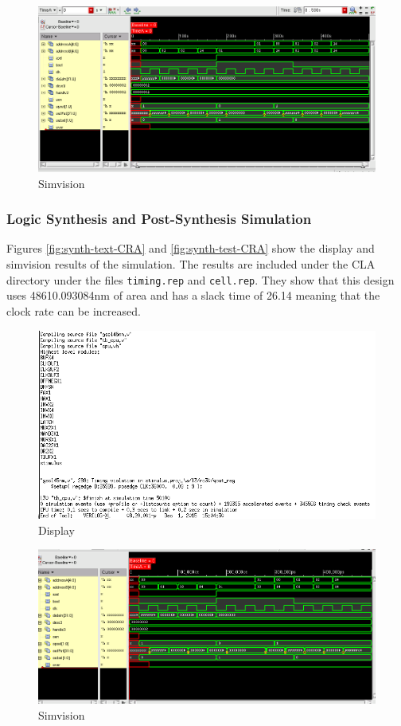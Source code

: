 \documentclass[12pt]{article}
\begin{document}
\begin{figure}[H]
\centering
\includegraphics[width=\linewidth]{../CLA/CLA-test}
\caption{Simvision}
\label{fig:CLA-test}
\end{figure}

\subsubsection{Logic Synthesis and Post-Synthesis Simulation}
Figures \ref{fig:synth-text-CRA} and \ref{fig:synth-test-CRA} show the display and simvision results of the simulation. The results are included under the CLA directory under the files \texttt{timing.rep} and \texttt{cell.rep}. They show that this design uses 48610.093084nm of area and has a slack time of 26.14 meaning that the clock rate can be increased.
\begin{figure}[H]
\centering
\includegraphics[width=.7\linewidth]{../CLA/synth-text}
\caption{Display}
\label{fig:synth-text-CLA}
\end{figure}

\begin{figure}[H]
\centering
\includegraphics[width=\linewidth]{../CLA/synth-test}
\caption{Simvision}
\label{fig:synth-test-CLA}
\end{figure}
\end{document}
